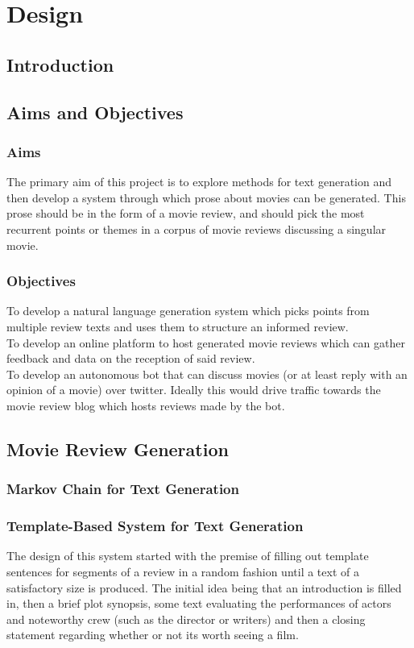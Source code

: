 
\chapter{\label{ch:3-design} Design}


\section{Introduction}

\section{Aims and Objectives}
\subsection{Aims}

The primary aim of this project is to explore methods for text generation and then develop a system through which prose about movies can be generated. This prose should be in the form of a movie review, and should pick the most recurrent points or themes in a corpus of movie reviews discussing a singular movie.

\subsection{Objectives}

To develop a natural language generation system which picks points from multiple review texts and uses them to structure an informed review.\\
To develop an online platform to host generated movie reviews which can gather feedback and data on the reception of said review.\\
To develop an autonomous bot that can discuss movies (or at least reply with an opinion of a movie) over twitter. Ideally this would drive traffic towards the movie review blog which hosts reviews made by the bot.

\section{Movie Review Generation}

\subsection{Markov Chain for Text Generation}
\subsection{Template-Based System for Text Generation}
The design of this system started with the premise of filling out template sentences for segments of a review in a random fashion until a text of a satisfactory size is produced. The initial idea being that an introduction is filled in, then a brief plot synopsis, some text evaluating the performances of actors and noteworthy crew (such as the director or writers) and then a closing statement regarding whether or not its worth seeing a film.\\

